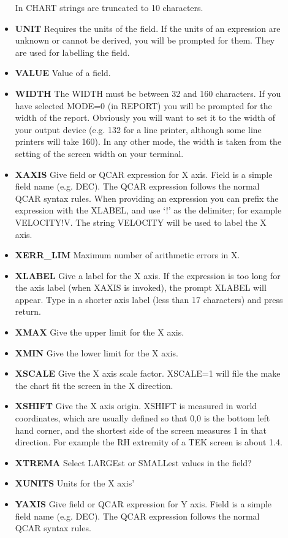 \begin{description}
\begin{itemize}
In CHART strings are truncated to 10 characters.
\item{\bf UNIT} Requires the units of the field. 
If the units of an expression are unknown or cannot be derived, you will 
be prompted for them.  
They are used for labelling the field.
\item{\bf VALUE} Value of a field.
\item{\bf WIDTH} The WIDTH must be between 32 and 160 characters. 
If you have selected MODE=0 (in REPORT) you will be prompted for the width 
of the report. 
Obviously you will want to set it to the width of your output device 
(e.g. 132 for a line printer, although some line printers will take 160).  
In any other mode, the width is taken from the setting of the screen width
on your terminal.
\item{\bf XAXIS} Give field or QCAR expression for X axis.
Field is a simple field name (e.g. DEC).  
The QCAR expression follows the normal QCAR syntax rules.
When providing an expression you can prefix the expression with the XLABEL,
and use `!' as the delimiter; for example VELOCITY!V.  
The string VELOCITY will be used to label the X axis.
\item {\bf XERR\_LIM} Maximum number of arithmetic errors in X.
\item{\bf XLABEL} Give a label for the X axis. 
If the expression is too long for the axis label (when XAXIS is invoked),
the prompt XLABEL will appear. 
Type in a shorter axis label (less than 17 characters) and press return.
\item{\bf XMAX} Give the upper limit for the X axis.
\item{\bf XMIN} Give the lower limit for the X axis.
\item{\bf XSCALE} Give the X axis scale factor.
XSCALE=1 will file the make the chart fit the screen in the X direction.
\item{\bf XSHIFT} Give the X axis origin. 
XSHIFT is measured in world coordinates,  which are usually defined so that 
0,0 is the bottom left hand corner, and the shortest side of the screen 
measures 1 in that direction. 
For example the RH extremity of a TEK screen is about 1.4. 
\item{\bf XTREMA} Select LARGEst or SMALLest values in the field?
\item{\bf XUNITS} Units for the X axis'
\item{\bf YAXIS} Give field or QCAR expression for Y axis.
Field is a simple field name (e.g. DEC).  
The QCAR expression follows the normal QCAR syntax rules.

\end{itemize}
\end{description}
